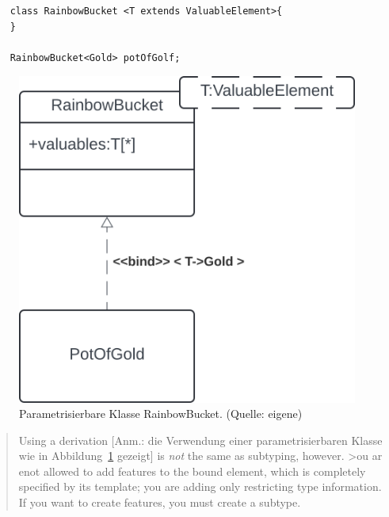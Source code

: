 \begin{verbatim}
    class RainbowBucket <T extends ValuableElement>{
    }

    RainbowBucket<Gold> potOfGolf;

\end{verbatim}
\begin{figure}
    \centering
    \includegraphics[scale=0.4]{part three/Klassendiagramme - Erweiterte Konzepte und Paketdiagramme/img/template}
    \caption{Parametrisierbare Klasse RainbowBucket. (Quelle: eigene)}
    \label{fig:template}
\end{figure}

\blockquote[{\cite[82, Hervorhebungen i.O.]{Fow03b}}]{
Using a derivation [Anm.: die Verwendung einer parametrisierbaren Klasse wie in Abbildung~\ref{fig:template} gezeigt] is \textit{not}
the same as subtyping, however. >ou ar enot allowed to add features to the bound element, which is completely specified by its template; you are adding only restricting type information. If you want to create features, you must create a subtype.
}
